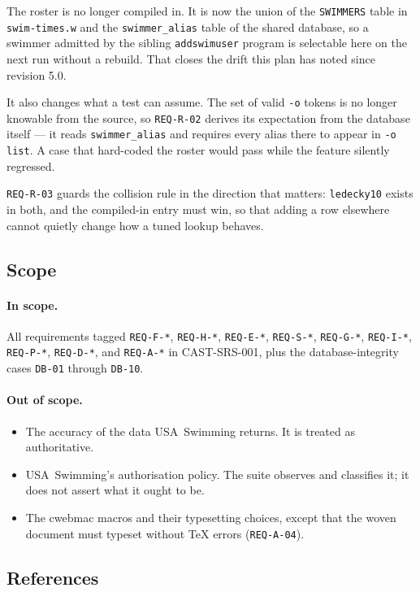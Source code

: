 \documentclass[12pt]{article}
\newcommand{\code}[1]{\texttt{#1}}
\newcommand{\req}[1]{\texttt{#1}}
\begin{document}
The roster is no longer compiled in.  It is now the union of the
\code{SWIMMERS} table in \code{swim-times.w} and the
\code{swimmer\_alias} table of the shared database, so a swimmer
admitted by the sibling \code{addswimuser} program is selectable here on
the next run without a rebuild.  That closes the drift this plan has
noted since revision 5.0.

It also changes what a test can assume.  The set of valid \code{-o}
tokens is no longer knowable from the source, so \req{REQ-R-02} derives
its expectation from the database itself --- it reads
\code{swimmer\_alias} and requires every alias there to appear in
\code{-o list}.  A case that hard-coded the roster would pass while the
feature silently regressed.

\req{REQ-R-03} guards the collision rule in the direction that matters:
\code{ledecky10} exists in both, and the compiled-in entry must win, so
that adding a row elsewhere cannot quietly change how a tuned lookup
behaves.

\subsection{Scope}

\paragraph{In scope.}  All requirements tagged \req{REQ-F-*},
\req{REQ-H-*}, \req{REQ-E-*}, \req{REQ-S-*}, \req{REQ-G-*},
\req{REQ-I-*}, \req{REQ-P-*}, \req{REQ-D-*}, and \req{REQ-A-*} in
CAST-SRS-001, plus the database-integrity cases \req{DB-01}
through \req{DB-10}.

\paragraph{Out of scope.}
\begin{itemize}
  \item The accuracy of the data USA~Swimming returns.  It is treated
        as authoritative.
  \item USA~Swimming's authorisation policy.  The suite observes and
        classifies it; it does not assert what it ought to be.
  \item The cwebmac macros and their typesetting choices, except that
        the woven document must typeset without \TeX{} errors
        (\req{REQ-A-04}).
\end{itemize}

\subsection{References}
\end{document}
